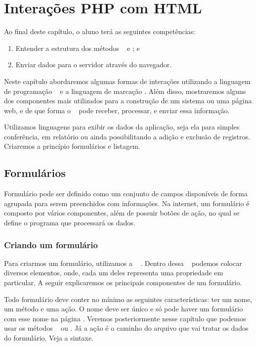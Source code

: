 \chapter{Interações PHP com HTML}
\label{interacoes-php-com-html}

Ao final deste capítulo, o aluno terá as seguintes competências:
\begin{enumerate}
    \item Entender a estrutura dos métodos \metodoGET~ e \metodoPOST; e
    \item Enviar dados para o servidor através do navegador.
\end{enumerate}

Neste capítulo abordaremos algumas formas de interações utilizando a linguagem de 
programação \php~ e a linguagem de marcação \html. Além disso, mostraremos alguns dos
componentes mais utilizados para a construção de um sistema ou uma página web, e de 
que forma o \php~ pode receber, processar, e enviar essa informação.

Utilizamos linguagens para exibir os dados da aplicação, seja ela para simples 
conferência, em relatório ou ainda possibilitando a adição e exclusão de registros. 
Criaremos a princípio formulários e listagem.

\section{Formulários}
\label{formularios}

Formulário pode ser definido como um conjunto de campos disponíveis de forma agrupada 
para serem preenchidos com informações. Na internet, um formulário é composto por vários 
componentes, além de possuir botões de ação, no qual se define o programa que processará 
os dados.

\subsection{Criando um formulário}
\label{criando-um-formulario}

Para criarmos um formulário, utilizamos a \tag~ \tagform. Dentro dessa \tag~ podemos colocar 
diversos elementos, onde, cada um deles representa uma propriedade em particular. 
A seguir explicaremos os principais componentes de um formulário.

Todo formulário deve conter no mínimo as seguintes características: ter um nome, um método
e uma ação. O nome deve ser único e só pode haver um formulário com esse nome na página
\php. Veremos posteriormente nesse capítulo que podemos usar os métodos \metodoGET~ ou
\metodoPOST. Já a ação é o caminho do arquivo que vai tratar os dados do formulário.
Veja a sintaxe.

